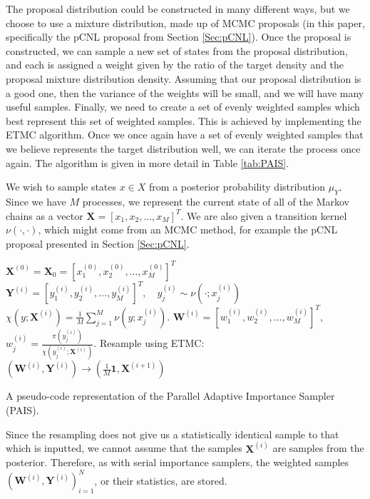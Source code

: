 \documentclass[final]{siamltex}
\newcommand{\X}{{\mathbf X}}
\newcommand{\Y}{{\mathbf Y}}
\newcommand{\W}{{\mathbf W}}
\begin{document}
The proposal distribution could be constructed in many different ways,
but we choose to use a mixture distribution, made up of MCMC proposals
(in this paper, specifically the pCNL proposal from Section \ref{Sec:pCNL}). Once the proposal is
constructed, we can sample a new set of states from the proposal
distribution, and each is assigned a weight given by the ratio of the target
density and the proposal mixture distribution density. Assuming that
our proposal distribution is a good one, then the variance of the
weights will be small, and we will have many useful samples. Finally, we
need to create a set of evenly weighted samples which best represent
this set of weighted samples. This is achieved by implementing the
ETMC algorithm. Once we once again have a set of evenly weighted
samples that we believe represents the target distribution well, we
can iterate the process once again. The algorithm is given in more detail in Table \ref{tab:PAIS}. 

We wish to sample states $x \in X$ from a posterior
probability distribution $\mu_Y$. Since we have $M$ processes, we
represent the current state of all of the Markov chains as a vector
$\X = [x_1,x_2,\ldots,x_M]^T$. We are also given a transition kernel
$\nu(\cdot,\cdot)$, which might come from an MCMC method, for example
the pCNL proposal presented in Section \ref{Sec:pCNL}.

\begin{table}
\begin{mdframed}
\begin{algorithmic}
\STATE $\X^{(0)} = \X_0 = [x_1^{(0)},x_2^{(0)},\ldots,x_M^{(0)}]^T$
\STATE $\Y^{(i)} = [y_1^{(i)},y_2^{(i)},\ldots,y_M^{(i)}]^T, \quad y_j^{(i)} \sim
\nu(\cdot;x_j^{(i)})$
\STATE $\chi(y;\X^{(i)}) = \frac{1}{M}
\sum_{j=1}^M \nu(y;x_j^{(i)})$.
\STATE $\W^{(i)} = [w_1^{(i)},w_2^{(i)},\ldots,w_M^{(i)}]^T,$ \quad $w^{(i)}_j =
\frac{\pi(y_j^{(i)})}{\chi(y_j^{(i)};\X^{(i)})}$.
\STATE Resample using ETMC: $(\W^{(i)},\Y^{(i)}) \rightarrow (\frac{1}{M}\mathbf{1}, \X^{(i+1)})$
\ENDFOR 
\end{algorithmic}
\end{mdframed}

\caption{A pseudo-code representation of the Parallel Adaptive
  Importance Sampler (PAIS).}
\label{tab:PAIS}
\end{table}

Since the resampling does not give us a statistically identical sample
to that which is inputted, we cannot assume that the samples $\X^{(i)}$
are samples from the posterior. Therefore, as with serial
importance samplers, the weighted samples
$(\W^{(i)},\Y^{(i)})_{i=1}^N$, or their statistics, are stored.
\end{document}
